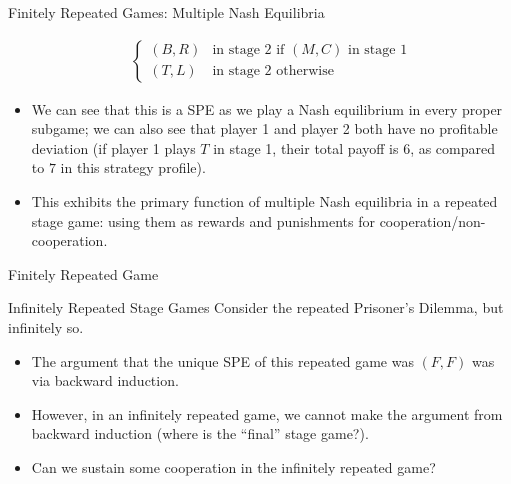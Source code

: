 \documentclass[10pt]{extarticle}
\begin{document}
\begin{problem}{Finitely Repeated Games: Multiple Nash Equilibria}
\begin{itemize}
\begin{align*}
\begin{cases}
            (B,R) & \text{in stage 2 if $(M,C)$ in stage 1}\\
            (T,L) & \text{in stage 2 otherwise}
          \end{cases}
        \end{align*}
      \item We can see that this is a SPE as we play a Nash equilibrium in every proper subgame; we can also see that player 1 and player 2 both have no profitable deviation (if player 1 plays $T$ in stage 1, their total payoff is $6$, as compared to $7$ in this strategy profile).
      \item This exhibits the primary function of multiple Nash equilibria in a repeated stage game: using them as rewards and punishments for cooperation/non-cooperation.
    \end{itemize}
  \end{problem}
  \begin{problem}{Finitely Repeated Game}
    \begin{tcbraster}[raster columns = 1,colframe = black!75!white,colback=white]
    \end{tcbraster}
  \end{problem}
  \begin{problem}{Infinitely Repeated Stage Games}
    Consider the repeated Prisoner's Dilemma, but infinitely so.
    \begin{itemize}
      \item The argument that the unique SPE of this repeated game was $(F,F)$ was via backward induction.
      \item However, in an infinitely repeated game, we cannot make the argument from backward induction (where is the ``final'' stage game?).
      \item Can we sustain some cooperation in the infinitely repeated game?
    \end{itemize}
  \end{problem}
\end{document}
